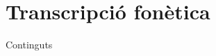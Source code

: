 \section{Transcripció fonètica}
\begin{frame}{Continguts}
\begin{multicols}{2}
\tableofcontents[currentsection]
\end{multicols}
\end{frame}

